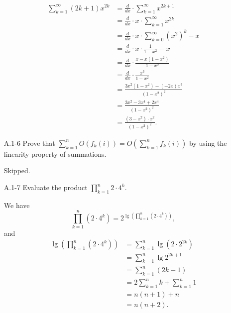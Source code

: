 \begin{enumerate}
\begin{framed}
\begin{equation*}
\begin{aligned}
  \sum_{k = 1}^{\infty} (2k + 1) x^{2k}
  &= \frac{d}{dx} \cdot \sum_{k = 1}^{\infty} x^{2k + 1}\\
  &= \frac{d}{dx} \cdot x \cdot \sum_{k = 1}^{\infty} x^{2k}\\
  &= \frac{d}{dx} \cdot x \cdot \sum_{k = 0}^{\infty} (x^2)^k - x\\
  &= \frac{d}{dx} \cdot x \cdot \frac{1}{1 - x^2} - x\\
  &= \frac{d}{dx} \cdot \frac{x - x (1 - x^2)}{1 - x^2}\\
  &= \frac{d}{dx} \cdot \frac{x^3}{1 - x^2}\\
  &= \frac{3 x^2 (1 - x^2) - (-2x) x^3}{(1 - x^2)^2}\\
  &= \frac{3 x^2 - 3 x^4 + 2 x^4}{(1 - x^2)^2}\\
  &= \frac{(3 - x^2) \cdot x^2}{(1 - x^2)^2}.
\end{aligned}
\end{equation*}
\end{framed}

\item[A.1{-}6] {Prove that
$\sum_{k=1}^{n} O(f_k(i)) = O(\sum_{k = 1}^{n} f_k(i))$ by using the linearity
property of summations.}

\begin{framed}
Skipped.
\end{framed}

\newpage

\item[A.1{-}7] {Evaluate the product $\prod_{k = 1}^{n} 2 \cdot 4^k$.}

\begin{framed}
We have
\[
  \prod_{k = 1}^n (2 \cdot 4^k) = 2^{\lg{\left(\prod_{k = 1}^n (2 \cdot 4^k)\right)}},
\]
and
\begin{equation*}
\begin{aligned}
  \lg{\left(\prod_{k = 1}^n (2 \cdot 4^k)\right)}
  &= \sum_{k = 1}^{n} \lg (2 \cdot 2^{2k})\\
  &= \sum_{k = 1}^{n} \lg 2^{2k + 1}\\
  &= \sum_{k = 1}^{n} (2k + 1)\\
  &= 2 \sum_{k = 1}^n k + \sum_{k = 1}^n 1\\
  &= n (n + 1) + n\\
  &= n (n + 2).
\end{aligned}
\end{equation*}


\end{framed}
\end{enumerate}

